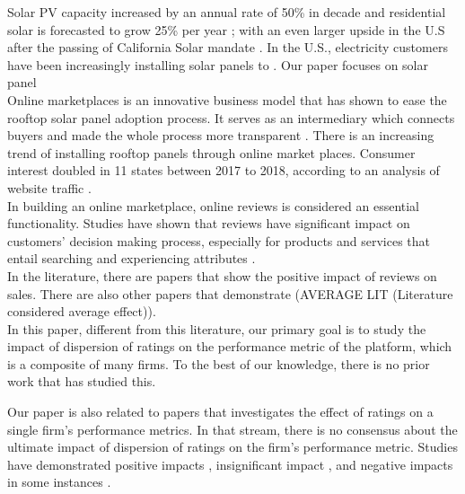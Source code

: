\documentclass[msom,blindrev]{informs3}
\begin{document}
 Solar PV capacity increased by an annual rate of 50\%  in decade and residential solar is forecasted to grow 25\% per year \citep{weaver_2019,seia}; with an even larger upside in the U.S after the passing of California Solar mandate \citep{gtmsolar2018}.
In the U.S., electricity customers have been increasingly installing solar panels to .
Our paper focuses on solar panel  \\


 


Online marketplaces is an innovative business model that has shown to ease the rooftop solar panel adoption process. It serves as an intermediary which connects buyers and made the whole process more transparent \citep{dorsey2019access}. There is an increasing trend of installing rooftop panels through online market places. Consumer interest doubled in 11 states between 2017 to 2018, according to an analysis of website traffic \citep{energysageintel19}.  \\

In building an online marketplace, online reviews is considered an essential functionality. Studies have shown that reviews have significant impact on customers'  decision making process, especially for products and services that entail searching and experiencing attributes \citep{zimmermann2018decomposing}.  \\
In the literature, there are papers that show the positive impact of reviews on sales. There are also other papers that demonstrate  (AVERAGE LIT (Literature considered average effect)).\\
In this paper, different from this literature, our primary goal is to study the impact of dispersion of ratings on the  performance metric of the platform, which is a composite of many firms. To the best of our knowledge, there is no prior work that has studied this.

Our paper is also related to papers that investigates the effect of ratings on a single firm's performance metrics. In that stream, there is no consensus about the ultimate impact of dispersion of ratings on the firm's performance metric. Studies have demonstrated positive impacts \citep{chintagunta2010effects,chevalier2006effect,dellarocas2007exploring}, insignificant impact \citep{duan2008online}, and negative impacts in some instances \citep{wang2015user}.
\end{document}

